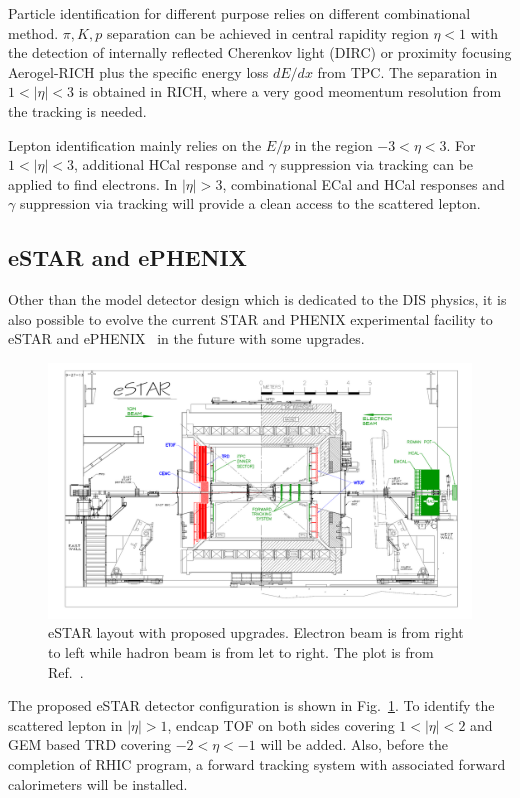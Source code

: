 Particle identification for different purpose relies on different combinational
method. $\pi, K, p$ separation can be achieved in central rapidity region
$\eta<1$ with the detection of internally reflected Cherenkov light (DIRC) or proximity
focusing Aerogel-RICH plus the specific energy loss $dE/dx$ from TPC. The separation in
$1<|\eta|<3$ is obtained in RICH, where a very good meomentum resolution from
the tracking is needed.

Lepton identification mainly relies on the $E/p$ in the region $-3<\eta<3$. For
$1<|\eta|<3$, additional HCal response and $\gamma$ suppression via tracking can
be applied to find electrons. In $|\eta|>3$, combinational ECal and HCal
responses and $\gamma$ suppression via tracking will provide a clean access to
the scattered lepton.


\subsection{eSTAR and ePHENIX}
Other than the model detector design which is dedicated to the DIS physics, it
is also possible to evolve the current STAR and PHENIX experimental facility to
eSTAR and ePHENIX~\cite{Adare:2014aaa} in the future with some upgrades. 


\begin{figure}
\centering
\includegraphics[width=1.0\textwidth]{plots/chpt4/eSTAR_layout.png}
\caption[A layout of the eSTAR detector concept]{
eSTAR layout with proposed upgrades. Electron beam is from right to left while hadron beam is from let to right. The plot is from Ref.~\cite{Abelev:eSTAR}.}
\label{fig:eSTAR_layout}
\end{figure}

The proposed eSTAR detector configuration is shown in
Fig.~\ref{fig:eSTAR_layout}. To identify the scattered lepton in $|\eta|>1$,
endcap TOF on both sides covering $1<|\eta|<2$ and GEM based TRD covering
$-2<\eta<-1$ will be added. Also, before the completion of RHIC program, a
forward tracking system with associated forward calorimeters will be installed.

